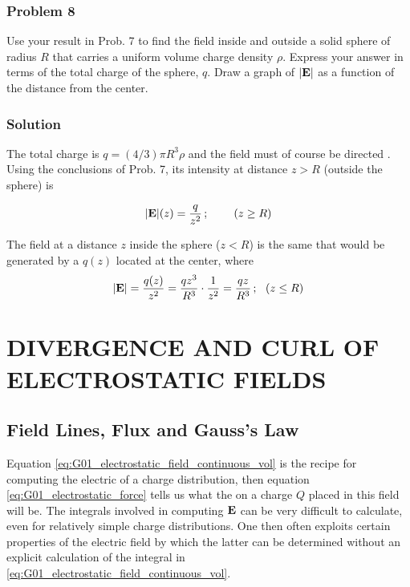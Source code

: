\subsubsection*{Problem 8}
Use your result in Prob. 7 to find the field inside and outside a solid sphere of radius $R$ that carries a uniform volume charge density $\rho$. Express your answer in terms of the total charge of the sphere, $q$. Draw a graph of $\abs{\vb{E}}$ as a function of the distance from the center.

\subsubsection*{Solution}
The total charge is $q = (4/3) \pi R^3 \rho$ and the field must of course be directed . Using the conclusions of Prob. 7, its intensity at distance $z > R$ (outside the sphere) is 

$$\abs{\vb{E}}(z) = \frac{q}{z^2}\,; \:\:\:\:\:\:\:\:\:\: (z \ge R)$$

The field at a distance $z$ inside the sphere ($z < R$)  is the same that would be generated by a  $q(z)$ located at the center, where 
$$\abs{\vb{E}} = \frac{q(z)}{z^2} = \frac{q z^3}{R^3} \cdot \frac{1}{z^2} = \frac{qz}{R^3}\,; \:\:\: (z \le R)$$ 


\section{DIVERGENCE AND CURL OF ELECTROSTATIC FIELDS}
\subsection{Field Lines, Flux and Gauss's Law}

Equation \ref{eq:G01_electrostatic_field_continuous_vol} is the recipe for computing the electric  of a charge distribution, then equation \ref{eq:G01_electrostatic_force} tells us what the  on a charge $Q$ placed in this field will be. The integrals involved in computing $\vb{E}$ can be very difficult to calculate, even for relatively simple charge distributions. One then often exploits certain properties of the electric field by which the latter can be determined without an explicit calculation of the integral in \ref{eq:G01_electrostatic_field_continuous_vol}. 

